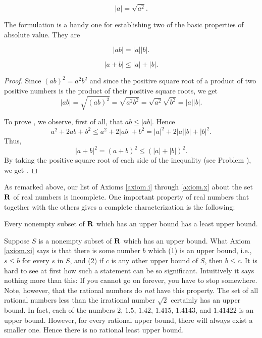 \begin{prop} 
\label{thm 1.1.2}
\[
 |a| = \sqrt {a^2} .   
\]
\end{prop}

The formulation  is a handy one
for establishing two of the basic properties of absolute value.
They are

\begin{prop} 
\label{thm 1.1.3}
\[
 |ab| = |a| |b|.
\]
\end{prop}

\begin{prop} 
\label{thm 1.1.4}
\[
 |a + b| \leq |a| + |b|.
\]
\end{prop}

\begin{proof}
Since $(ab)^2 = {a^2}{b^2}$
and since the positive square root of a product of two positive numbers
is the product of their positive square roots,
we get 
\[
|ab| = \sqrt {(ab)^2}  = \sqrt {{a^2}{b^2}}  = \sqrt{a^2} \sqrt{b^2} = |a| |b|.
\]

To prove ,
we observe, first of all, that $ab \leq |ab|$.
Hence
\[
a^2 + 2ab + b^2 \leq a^2 + 2|ab| + b^{2} = |a|^2 + 2|a| |b| + |b|^2.
\]
Thus,
\[
|a + b|^{2} = (a + b)^{2} \leq (|a| + |b|)^{2}.
\]
By taking the positive square root of each side of the inequality
(see Problem ), we get .
\end{proof}

As remarked above, our list of Axioms
\ref{axiom.i} through \ref{axiom.x}
about the set $\mathrm{\bf R}$ of real numbers is incomplete.
One important property of real numbers
that together with the others gives a complete characterization
is the following:


\begin{axiom}
\label{axiom.xi}
Every nonempty subset of $\mathrm{\bf R}$ which has an upper bound
has a least upper bound.
\end{axiom}

Suppose $S$ is a nonempty subset of $\mathrm{\bf R}$ which has an upper bound.
What Axiom \ref{axiom.xi} says
is that there is some number $b$ which
(1) is an upper bound, i.e., $s \leq b$ for every $s$ in $S$, and
(2) if $c$ is any other upper bound of $S$, then $b \leq c$.
It is hard to see at first how such a statement can be so significant.
Intuitively it says nothing more than this:
If you cannot go on forever, you have to stop somewhere.
Note, however, that the rational numbers do \emph{not} have this property.
The set of all rational numbers less than the irrational number $\sqrt2$
certainly has an upper bound.
In fact, each of the numbers
$2$, $1.5$, $1.42$, $1.415$, $1.4143$, and $1.41422$ is an upper bound.
However, for every rational upper bound,
there will always exist a smaller one.
Hence there is no rational least upper bound.
